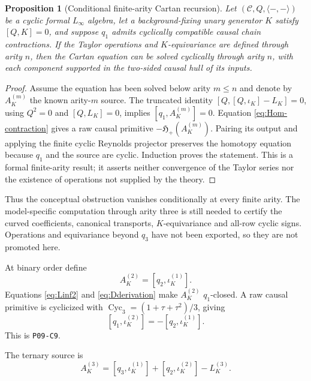 \documentclass[11pt]{article}
\newtheorem{proposition}[theorem]{Proposition}
\theoremstyle{definition}
\theoremstyle{remark}
\newcommand{\cC}{\mathcal C}
\newcommand{\Cyc}{\operatorname{Cyc}}
\newcommand{\claimid}[1]{\texttt{#1}}
\begin{document}
\begin{proposition}[Conditional finite-arity Cartan recursion]
\label{prop:formal-recursion}
Let $(\cC,Q,\langle-,-\rangle)$ be a cyclic formal $L_\infty$ algebra, let a
background-fixing unary generator $K$ satisfy $[Q,K]=0$, and suppose $q_1$
admits cyclically compatible causal chain contractions.  If the Taylor
operations and $K$-equivariance are defined through arity $n$, then the Cartan
equation can be solved cyclically through arity $n$, with each component
supported in the two-sided causal hull of its inputs.
\end{proposition}

\begin{proof}
Assume the equation has been solved below arity $m\leq n$ and denote by
$A_K^{(m)}$ the known arity-$m$ source.  The truncated identity
$[Q,[Q,\iota_K]-L_K]=0$, using $Q^2=0$ and $[Q,L_K]=0$, implies
$[q_1,A_K^{(m)}]=0$.  Equation \eqref{eq:Hom-contraction} gives a raw causal
primitive $-\mathfrak H_+(A_K^{(m)})$.  Pairing its output and applying the
finite cyclic Reynolds projector preserves the homotopy equation because
$q_1$ and the source are cyclic.  Induction proves the statement.  This is a
formal finite-arity result; it asserts neither convergence of the Taylor
series nor the existence of operations not supplied by the theory.
\end{proof}

Thus the conceptual obstruction vanishes conditionally at every finite
arity.  The model-specific computation through arity three is still needed
to certify the curved coefficients, canonical transports, $K$-equivariance
and all-row cyclic signs.  Operations and equivariance beyond $q_3$ have not
been exported, so they are not promoted here.

At binary order define
\begin{equation}\label{eq:A2}
 A_K^{(2)}=[q_2,\iota_K^{(1)}].
\end{equation}
Equations \eqref{eq:Linf2} and \eqref{eq:Dderivation} make $A_K^{(2)}$
$q_1$-closed.  A raw causal primitive is cyclicized with
$\Cyc_3=(1+\tau+\tau^2)/3$, giving
\begin{equation}\label{eq:Cartan2}
 [q_1,\iota_K^{(2)}]=-[q_2,\iota_K^{(1)}].
\end{equation}
This is \claimid{P09-C9}.

The ternary source is
\begin{equation}\label{eq:A3}
 A_K^{(3)}=[q_3,\iota_K^{(1)}]+[q_2,\iota_K^{(2)}]-L_K^{(3)}.
\end{equation}
\end{document}
